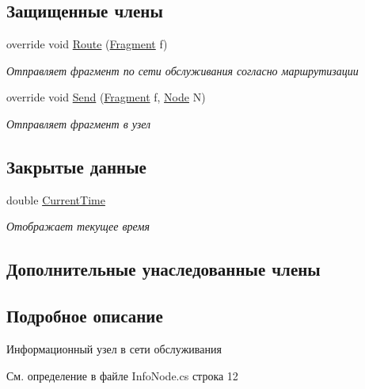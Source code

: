 \subsection*{Защищенные члены}
\begin{DoxyCompactItemize}
\item 
override void \hyperlink{class_network_simulator_1_1_info_node_ac3c8aef408eab567fa2ede91c307ef83}{Route} (\hyperlink{class_network_simulator_1_1_fragment}{Fragment} f)
\begin{DoxyCompactList}\small\item\em Отправляет фрагмент по сети обслуживания согласно маршрутизации \end{DoxyCompactList}\item 
override void \hyperlink{class_network_simulator_1_1_info_node_a02fd3b4fb6f6554d09850cdc04154db6}{Send} (\hyperlink{class_network_simulator_1_1_fragment}{Fragment} f, \hyperlink{class_network_simulator_1_1_node}{Node} N)
\begin{DoxyCompactList}\small\item\em Отправляет фрагмент в узел \end{DoxyCompactList}\end{DoxyCompactItemize}
\subsection*{Закрытые данные}
\begin{DoxyCompactItemize}
\item 
double \hyperlink{class_network_simulator_1_1_info_node_a7e608899dfefba1c814626371225d87b}{Current\+Time}
\begin{DoxyCompactList}\small\item\em Отображает текущее время \end{DoxyCompactList}\end{DoxyCompactItemize}
\subsection*{Дополнительные унаследованные члены}


\subsection{Подробное описание}
Информационный узел в сети обслуживания 



См. определение в файле Info\+Node.\+cs строка 12



